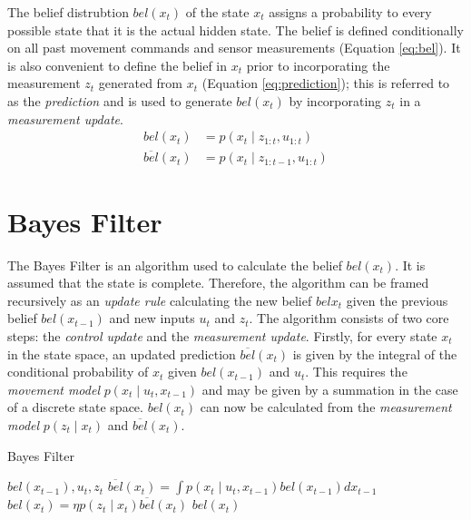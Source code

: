 \documentclass[english]{article}
\begin{document}
The belief distrubtion $bel(x_t)$ of the state $x_t$ assigns a probability to every possible state that it is the actual hidden state. The belief is defined conditionally on all past movement commands and sensor measurements\cite{probrob} (Equation \ref{eq:bel}). It is also convenient to define the belief in $x_t$ prior to incorporating the measurement $z_t$ generated from $x_t$ (Equation \ref{eq:prediction}); this is referred to as the \emph{prediction} and is used to generate $bel(x_t)$ by incorporating $z_t$ in a \emph{measurement update}.
\begin {align}
  bel(x_t) & = p(x_t \mid z_{1:t},u_{1:t}) \label{eq:bel} \\   
  \overline{bel}(x_t) & = p(x_t \mid z_{1:t-1}, u_{1:t}) \label{eq:prediction}
\end {align}


\section*{Bayes Filter}
The Bayes Filter is an algorithm used to calculate the belief $bel(x_t)$. It is assumed that the state is complete. Therefore, the algorithm can be framed recursively as an \emph{update rule} calculating the new belief $bel{x_t}$ given the previous belief $bel(x_{t-1})$ and new inputs $u_t$ and $z_t$. The algorithm consists of two core steps: the \emph{control update} and the \emph{measurement update}. Firstly, for every state $x_t$ in the state space, an updated prediction $\overline{bel}(x_t)$ is given by the integral of the conditional probability of $x_t$ given $bel(x_{t-1})$ and $u_t$\cite{probrob}. This requires the \emph{movement model} $p(x_t \mid u_t,x_{t-1})$ and may be given by a summation in the case of a discrete state space. $bel(x_t)$ can now be calculated from the \emph{measurement model} $p(z_t \mid x_t)$ and $\overline{bel}(x_t)$.

\begin{algorithm}
\caption{Bayes Filter}
\label{alg:bayes}
\begin{algorithmic}
	\REQUIRE $bel(x_{t-1}), u_t, z_t$
        \STATE $\overline{bel}(x_t)  = \int p(x_t \mid u_t, x_{t-1})bel(x_{t-1}) dx_{t-1}$
        \STATE $bel(x_t)  = \eta p(z_t \mid x_t) \overline{bel}(x_t)$
        \ENDFOR
        \RETURN $bel(x_t)$
\end{algorithmic}
\end{algorithm}
\end{document}
